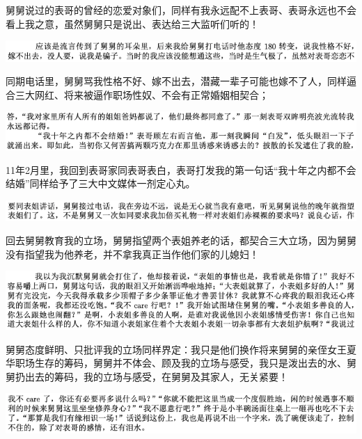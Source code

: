\documentclass[9pt, b5paper]{article}
\begin{document}
舅舅说过的表哥的曾经的恋爱对象们，同样有我永远配不上表哥、表哥永远也不会看上我之意，虽然舅舅只是说出、表达给三大监听们听的！

\begin{center}
\includegraphics[width=.9\linewidth]{./pic/backups_plans_20210412_171215.png}
\end{center}

同期电话里，舅舅骂我性格不好、嫁不出去，潜藏一辈子可能也嫁不了人，同样逼合三大网红、将来被逼作职场性奴、不会有正常婚姻相契合；

\begin{center}
\includegraphics[width=.9\linewidth]{./pic/backups_plans_20210412_171242.png}
\end{center}

11年2月里，我回到表哥家同表哥表白，表哥打发我的第一句话“我十年之内都不会结婚”同样给予了三大中文媒体一剂定心丸。

\begin{center}
\includegraphics[width=.9\linewidth]{./pic/backups_plans_20210412_171427.png}
\end{center}

回去舅舅教育我的立场，舅舅指望两个表姐养老的话，都契合三大立场，因为舅舅没有指望我为他养老，并不拿我真正当作他们家的儿媳妇！

\begin{center}
\includegraphics[width=.9\linewidth]{./pic/backups_plans_20210412_171555.png}
\end{center}

舅舅态度鲜明、只批评我的立场同样界定：我只是他们换作将来舅舅的亲侄女王夏华职场生存的筹码，舅舅并不体会、顾及我的立场与感受，我只是泼出去的水、舅舅扔出去的筹码，我的立场与感受，在舅舅及其家人，无关紧要！

\begin{center}
\includegraphics[width=.9\linewidth]{./pic/backups_plans_20210412_171513.png}
\end{center}
\end{document}
